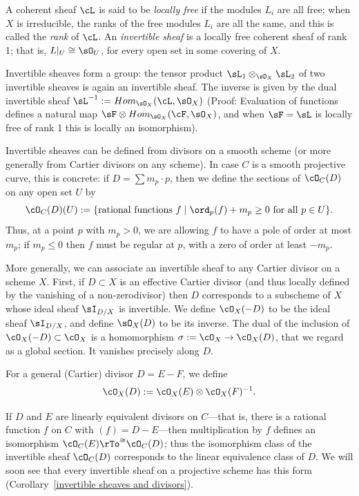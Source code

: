A coherent sheaf $\cL$ is said to be \emph{locally free} if the modules $L_i$ are all free; when $X$ is irreducible, the ranks of the free modules $L_{i}$ are all the same, and this is called the \emph{rank} of $\cL$.
An \emph{invertible sheaf} is a locally free coherent sheaf of rank 1;  that is, $L|_U \cong \sO_U$,
for every open set in some covering of $X$. 

Invertible sheaves form a group: the tensor product  $\sL_1\otimes_{\sO_X}\sL_2$ of two invertible sheaves is  again an invertible sheaf. The inverse is given by the dual invertible sheaf $\sL^{-1} := Hom_{\sO_X}(\cL,\sO_X)$
(Proof: Evaluation of functions defines a natural map $\sF \otimes  Hom_{\sO_X}(\cF,\sO_X)$,
and when $\sF = \sL$ is locally free of rank 1 this is locally an isomorphism). 

Invertible sheaves can be defined from divisors on a smooth scheme (or more generally from Cartier divisors on any scheme). In case $C$ is a smooth projective curve, this is concrete: if $D = \sum m_p \cdot p$, then we define the sections of $\cO_C(D)$ on any open set $U$ by
$$
\cO_C(D)(U) := \{ \text{rational functions } f \mid \ord_p(f) + m_p \geq 0 \text{ for all } p \in U \}.
$$
Thus, at a point $p$ with $m_p > 0$, we are allowing $f$ to have a pole of order at most $m_p$; if $m_p \leq 0$ then $f$ must be regular at $p$, with a zero of order at least $-m_p$.

More generally, we can associate an invertible sheaf to any Cartier divisor on a scheme $X$.
First, if
 $D\subset X$ is an effective Cartier divisor (and thus locally defined by the vanishing of a non-zerodivisor) then
$D$ corresponds to a subscheme of $X$ whose ideal sheaf $\sI_{D/X}$
is invertible. We define $\cO_X(-D)$ to be the ideal sheaf $\sI_{D/X}$, and define $\sO_{X}(D)$ to be 
its inverse. The dual of the inclusion of
$\cO_X(-D) \subset \cO_X$ is a homomorphism $\sigma := \cO_X \to \cO_X(D)$, that we regard as a global section. It
vanishes precisely along $D$. 

For a general (Cartier) divisor $D = E - F$, we define
$$
\cO_X(D) := \cO_X(E) \otimes \cO_X(F)^{-1}.
$$


 If $D$ and $E$ are linearly equivalent divisors on $C$---that is, there is a rational function $f$ on $C$ with $(f) = D - E$---then multiplication by $f$ defines an isomorphism $\cO_C(E) \rTo^{\cong} \cO_C(D)$; thus the isomorphism class of the invertible sheaf $\cO_C(D)$ corresponds to the linear equivalence class of $D$. We will soon see that every invertible sheaf on a projective scheme has this form  (Corollary~\ref{invertible sheaves and divisors}).


